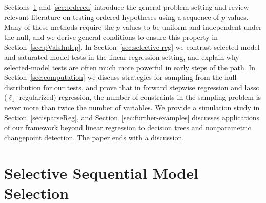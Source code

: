 \documentclass{article}
\begin{document}
Sections~\ref{sec:genericSetting} and \ref{sec:ordered} introduce the general problem setting and review relevant literature on testing ordered hypotheses using a sequence of $p$-values. Many of these methods require the $p$-values to be uniform and independent under the null, and we derive general conditions to ensure this property in Section~\ref{sec:pValsIndep}. In Section~\ref{sec:selective-reg} we contrast selected-model and saturated-model tests in the linear regression setting, and explain why selected-model tests are often much more powerful in early steps of the path. In Section~\ref{sec:computation} we discuss strategies for sampling from the null distribution for our tests, and prove that in forward stepwise regression and lasso ($\ell_1$-regularized) regression, the number of constraints in the sampling problem is never more than twice the number of variables. We provide a simulation study in Section~\ref{sec:sparseReg}, and Section~\ref{sec:further-examples} discusses applications of our framework beyond linear regression to decision trees and nonparametric changepoint detection. The paper ends with a discussion.

\section{Selective Sequential Model Selection}
\label{sec:genericSetting}
\end{document}
